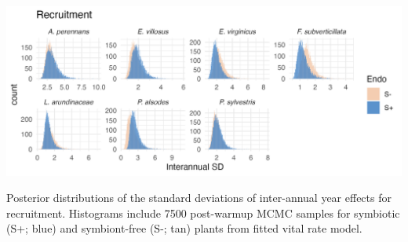 \documentclass[lineno, sn-basic]{sn-jnl}%
\providecommand{\DIFaddbegin}{} %
\providecommand{\DIFaddend}{} %
\providecommand{\DIFdelbegin}{} %
\providecommand{\DIFdelend}{} %
\providecommand{\DIFaddbeginFL}{} %
\providecommand{\DIFaddendFL}{} %
\providecommand{\DIFdelbeginFL}{} %
\providecommand{\DIFdelendFL}{} %
\newcommand{\DIFscaledelfig}{0.5}
\newlength{\DIFdelgraphicswidth} %
\newlength{\DIFdelgraphicsheight} %
\newcommand{\DIFaddincludegraphics}[2][]{{\color{blue}\fbox{\DIFOincludegraphics[#1]{#2}}}} %
\newcommand{\DIFdelincludegraphics}[2][]{%
\sbox{\DIFdelgraphicsbox}{\DIFOincludegraphics[#1]{#2}}%
\settoboxwidth{\DIFdelgraphicswidth}{\DIFdelgraphicsbox} %
\settoboxtotalheight{\DIFdelgraphicsheight}{\DIFdelgraphicsbox} %
\scalebox{\DIFscaledelfig}{%
\parbox[b]{\DIFdelgraphicswidth}{\usebox{\DIFdelgraphicsbox}\\[-\baselineskip] \rule{\DIFdelgraphicswidth}{0em}}\llap{\resizebox{\DIFdelgraphicswidth}{\DIFdelgraphicsheight}{%
\setlength{\unitlength}{\DIFdelgraphicswidth}%
\begin{picture}(1,1)%
\thicklines\linethickness{2pt} %
{\color[rgb]{1,0,0}\put(0,0){\framebox(1,1){}}}%
{\color[rgb]{1,0,0}\put(0,0){\line( 1,1){1}}}%
{\color[rgb]{1,0,0}\put(0,1){\line(1,-1){1}}}%
\end{picture}%
}\hspace*{3pt}}} %
} %
\DeclareRobustCommand{\DIFaddbegin}{\DIFOaddbegin \let\includegraphics\DIFaddincludegraphics} %
\DeclareRobustCommand{\DIFaddend}{\DIFOaddend \let\includegraphics\DIFOincludegraphics} %
\DeclareRobustCommand{\DIFdelbegin}{\DIFOdelbegin \let\includegraphics\DIFdelincludegraphics} %
\DeclareRobustCommand{\DIFdelend}{\DIFOaddend \let\includegraphics\DIFOincludegraphics} %
\DeclareRobustCommand{\DIFaddbeginFL}{\DIFOaddbeginFL \let\includegraphics\DIFaddincludegraphics} %
\DeclareRobustCommand{\DIFaddendFL}{\DIFOaddendFL \let\includegraphics\DIFOincludegraphics} %
\DeclareRobustCommand{\DIFdelbeginFL}{\DIFOdelbeginFL \let\includegraphics\DIFdelincludegraphics} %
\DeclareRobustCommand{\DIFdelendFL}{\DIFOaddendFL \let\includegraphics\DIFOincludegraphics} %
\begin{document}
\DIFdelbegin %
\DIFdelendFL \DIFaddbeginFL \begin{myfigure}[H]
	\DIFaddendFL \centering
	\includegraphics[width=.9\linewidth]{recruit_sigmayear_hist.png}
	\DIFdelbeginFL %
\DIFdelendFL \DIFaddbeginFL \caption[Posterior distributions of the standard deviations of inter-annual year effects for recruitment]{\DIFaddendFL Posterior distributions of the standard deviations of inter-annual year effects for recruitment. Histograms include 7500 post-warmup MCMC samples for symbiotic (S+; blue) and symbiont-free (S-; tan) plants from fitted vital rate model.}
\DIFdelbeginFL %
\DIFdelend \DIFaddbegin \end{myfigure}
\DIFaddend 
\end{document}
